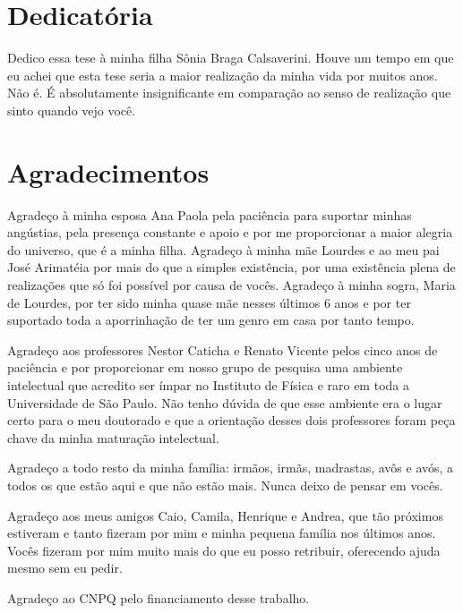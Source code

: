 \begin{titlepage}

\chapter*{Dedicatória}

Dedico essa tese à minha filha Sônia Braga Calsaverini. Houve um tempo em que eu achei que esta tese seria a maior realização da minha vida por muitos anos. Não é. É absolutamente insignificante em comparação ao senso de realização que sinto quando vejo você.

\chapter*{Agradecimentos}

Agradeço à minha esposa Ana Paola pela paciência para suportar minhas angústias, pela presença constante e apoio e por me proporcionar a maior alegria do universo, que é a minha filha. Agradeço à minha mãe Lourdes e ao meu pai José Arimatéia por mais do que a simples existência, por uma existência plena de realizações que só foi possível por causa de vocês. Agradeço à minha sogra, Maria de Lourdes, por ter sido minha quase mãe nesses últimos 6 anos e por ter suportado toda a aporrinhação de ter um genro em casa por tanto tempo.

Agradeço aos professores Nestor Caticha e Renato Vicente pelos cinco anos de paciência e por proporcionar em nosso grupo de pesquisa uma ambiente intelectual que acredito ser ímpar no Instituto de Física e raro em toda a Universidade de São Paulo. Não tenho dúvida de que esse ambiente era o lugar certo para o meu doutorado e que a orientação desses dois professores foram peça chave da minha maturação intelectual. 

Agradeço a todo resto da minha família: irmãos, irmãs, madrastas, avôs e avós, a todos os que estão aqui e que não estão mais. Nunca deixo de pensar em vocês. 

Agradeço aos meus amigos Caio, Camila, Henrique e Andrea, que tão próximos estiveram e tanto fizeram por mim e minha pequena família nos últimos anos. Vocês fizeram por mim muito mais do que eu posso retribuir, oferecendo ajuda mesmo sem eu pedir.

Agradeço ao CNPQ pelo financiamento desse trabalho.

\end{titlepage}